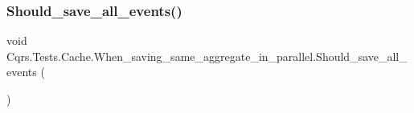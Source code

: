 \subsubsection{\texorpdfstring{Should\+\_\+save\+\_\+all\+\_\+events()}{Should\_save\_all\_events()}}
{\footnotesize\ttfamily void Cqrs.\+Tests.\+Cache.\+When\+\_\+saving\+\_\+same\+\_\+aggregate\+\_\+in\+\_\+parallel.\+Should\+\_\+save\+\_\+all\+\_\+events (\begin{DoxyParamCaption}{ }\end{DoxyParamCaption})}

